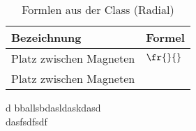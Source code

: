 \begin{table}[h!]

\centering
\caption{Formlen aus der Class (Radial)}
\label{tab:class.rad}
\renewcommand{\arraystretch}{2}
\setlength{\tabcolsep}{10mm}

\begin{tabular}{ll}
    \toprule
     Bezeichnung & Formel\\
    \midrule
	Platz zwischen Magneten&$\fr{}{}$\\
	Platz zwischen Magneten&$\frac{}{}$\\
	
    \bottomrule
  \end{tabular}
\end{table}

d
bballsbdasldaskdasd\\

dasfsdfsdf\\


